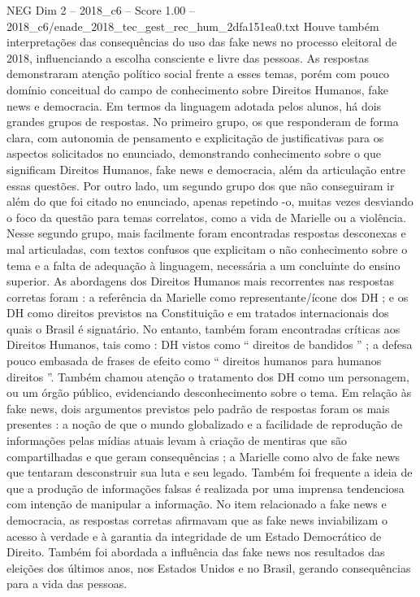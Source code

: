 \begin{textsample}{NEG Dim 2 – 2018\_c6 – Score 1.00 – 2018\_c6/enade\_2018\_tec\_gest\_rec\_hum\_2dfa151ea0.txt}
Houve também interpretações das consequências do uso das fake news no processo eleitoral de 2018, influenciando a escolha consciente e livre das pessoas.
As respostas demonstraram atenção político social frente a esses temas, porém com pouco domínio conceitual do campo de conhecimento sobre Direitos Humanos, fake news e democracia.
Em termos da linguagem adotada pelos alunos, há dois grandes grupos de respostas.
No primeiro grupo, os que responderam de forma clara, com autonomia de pensamento e explicitação de justificativas para os aspectos solicitados no enunciado, demonstrando conhecimento sobre o que significam Direitos Humanos, fake news e democracia, além da articulação entre essas questões.
Por outro lado, um segundo grupo dos que não conseguiram ir além do que foi citado no enunciado, apenas repetindo -o, muitas vezes desviando o foco da questão para temas correlatos, como a vida de Marielle ou a violência.
Nesse segundo grupo, mais facilmente foram encontradas respostas desconexas e mal articuladas, com textos confusos que explicitam o não conhecimento sobre o tema e a falta de adequação à linguagem, necessária a um concluinte do ensino superior.
As abordagens dos Direitos Humanos mais recorrentes nas respostas corretas foram : a referência da Marielle como representante/ícone dos DH ; e os DH como direitos previstos na Constituição e em tratados internacionais dos quais o Brasil é signatário.
No entanto, também foram encontradas críticas aos Direitos Humanos, tais como : DH vistos como “ direitos de bandidos ” ; a defesa pouco embasada de frases de efeito como “ direitos humanos para humanos direitos ”.
Também chamou atenção o tratamento dos DH como um personagem, ou um órgão público, evidenciando desconhecimento sobre o tema.
Em relação às fake news, dois argumentos previstos pelo padrão de respostas foram os mais presentes : a noção de que o mundo globalizado e a facilidade de reprodução de informações pelas mídias atuais levam à criação de mentiras que são compartilhadas e que geram consequências ; a Marielle como alvo de fake news que tentaram desconstruir sua luta e seu legado.
Também foi frequente a ideia de que a produção de informações falsas é realizada por uma imprensa tendenciosa com intenção de manipular a informação.
No item relacionado a fake news e democracia, as respostas corretas afirmavam que as fake news inviabilizam o acesso à verdade e à garantia da integridade de um Estado Democrático de Direito.
Também foi abordada a influência das fake news nos resultados das eleições dos últimos anos, nos Estados Unidos e no Brasil, gerando consequências para a vida das pessoas.

\end{textsample}
